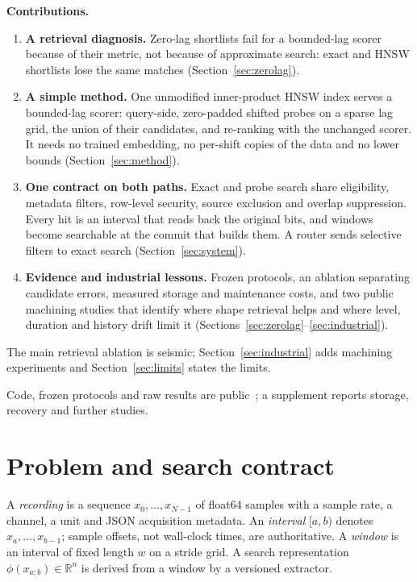 \documentclass[sigconf]{acmart}
\begin{document}
\textbf{Contributions.}
\begin{enumerate}
\item \textbf{A retrieval diagnosis.} Zero-lag shortlists fail for a bounded-lag scorer because of their metric, not because of approximate search: exact and HNSW shortlists lose the same matches (Section~\ref{sec:zerolag}).
\item \textbf{A simple method.} One unmodified inner-product HNSW index serves a bounded-lag scorer: query-side, zero-padded shifted probes on a sparse lag grid, the union of their candidates, and re-ranking with the unchanged scorer. It needs no trained embedding, no per-shift copies of the data and no lower bounds (Section~\ref{sec:method}).
\item \textbf{One contract on both paths.} Exact and probe search share eligibility, metadata filters, row-level security, source exclusion and overlap suppression. Every hit is an interval that reads back the original bits, and windows become searchable at the commit that builds them. A router sends selective filters to exact search (Section~\ref{sec:system}).
\item \textbf{Evidence and industrial lessons.} Frozen protocols, an ablation separating candidate errors, measured storage and maintenance costs, and two public machining studies that identify where shape retrieval helps and where level, duration and history drift limit it (Sections~\ref{sec:zerolag}--\ref{sec:industrial}).
\end{enumerate}
The main retrieval ablation is seismic; Section~\ref{sec:industrial} adds machining experiments and Section~\ref{sec:limits} states the limits.

Code, frozen protocols and raw results are public~\cite{repo}; a supplement reports storage, recovery and further studies.

\section{Problem and search contract}\label{sec:problem}
A \emph{recording} is a sequence $x_0,\ldots,x_{N-1}$ of float64 samples with a sample rate, a channel, a unit and JSON acquisition metadata. An \emph{interval} $[a,b)$ denotes $x_a,\ldots,x_{b-1}$; sample offsets, not wall-clock times, are authoritative. A \emph{window} is an interval of fixed length $w$ on a stride grid. A search representation $\phi(x_{a:b})\in\mathbb{R}^n$ is derived from a window by a versioned extractor.
\end{document}
